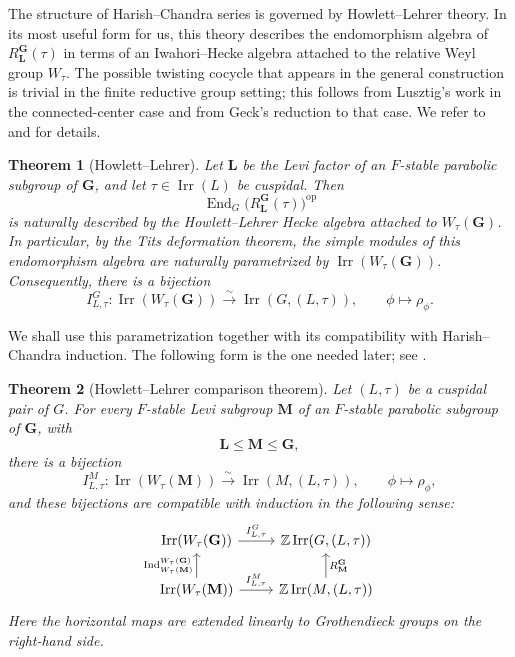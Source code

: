 \documentclass{amsart}
\theoremstyle{plain}
\numberwithin{equation}{section}
\newtheorem{theorem}{Theorem}[section]
\theoremstyle{definition}
\newcommand{\Ind}{\operatorname{Ind}}
\newcommand{\End}{\operatorname{End}}
\newcommand{\Irr}{\operatorname{Irr}}
\newcommand{\bG}{\mathbf{G}}
\newcommand{\bL}{\mathbf{L}}
\newcommand{\bM}{\mathbf{M}}
\begin{document}
The structure of Harish--Chandra series is governed by Howlett--Lehrer theory.
In its most useful form for us, this theory describes the endomorphism algebra
of \(R_{\bL}^{\bG}(\tau)\) in terms of an Iwahori--Hecke algebra attached to
the relative Weyl group \(W_\tau\).  The possible twisting cocycle that appears
in the general construction is trivial in the finite reductive group setting;
this follows from Lusztig's work in the connected-center case and from Geck's
reduction to that case.  We refer to \cite{HowlettLehrer} and
\cite[\S 3.2]{Book:GeckandMalle} for details.

\begin{theorem}[Howlett--Lehrer]
\label{thm:Howlett-Lehrer}
Let \(\bL\) be the Levi factor of an \(F\)-stable parabolic subgroup of
\(\bG\), and let \(\tau\in\Irr(L)\) be cuspidal.  Then
\[
\End_G\!\bigl(R_{\bL}^{\bG}(\tau)\bigr)^{\mathrm{op}}
\]
is naturally described by the Howlett--Lehrer Hecke algebra attached to
\(W_\tau(\bG)\).  In particular, by the Tits deformation theorem, the simple
modules of this endomorphism algebra are naturally parametrized by
\(\Irr(W_\tau(\bG))\).  Consequently, there is a bijection
\[
I_{L,\tau}^{G}:\Irr(W_\tau(\bG))
\xrightarrow{\sim}
\Irr(G,(L,\tau)),
\qquad
\phi\longmapsto \rho_\phi .
\]
\end{theorem}

We shall use this parametrization together with its compatibility with
Harish--Chandra induction.  The following form is the one needed later; see
\cite[Theorem~3.2.7]{Book:GeckandMalle}.

\begin{theorem}[Howlett--Lehrer comparison theorem]
\label{thm:Howlett-Lehrer-comparison}
Let \((L,\tau)\) be a cuspidal pair of \(G\).  For every \(F\)-stable Levi
subgroup \(\bM\) of an \(F\)-stable parabolic subgroup of \(\bG\), with
\[
\bL\leq \bM\leq \bG,
\]
there is a bijection
\[
I_{L,\tau}^{M}:
\Irr(W_{\tau}(\bM))
\xrightarrow{\sim}
\Irr(M,(L,\tau)),
\qquad
\phi\longmapsto \rho_\phi ,
\]
and these bijections are compatible with induction in the following sense:
\[
\begin{tikzcd}
\Irr(W_{\tau}(\bG))
\arrow[r,"I_{L,\tau}^{G}"]
& \mathbb{Z}\Irr(G,(L,\tau)) \\
\Irr(W_{\tau}(\bM))
\arrow[u,"\Ind_{W_{\tau}(\bM)}^{W_{\tau}(\bG)}"]
\arrow[r,"I_{L,\tau}^{M}"]
& \mathbb{Z}\Irr(M,(L,\tau))
\arrow[u,"R_{\bM}^{\bG}"']
\end{tikzcd}
\]
Here the horizontal maps are extended linearly to Grothendieck groups on the
right-hand side.
\end{theorem}
\end{document}
